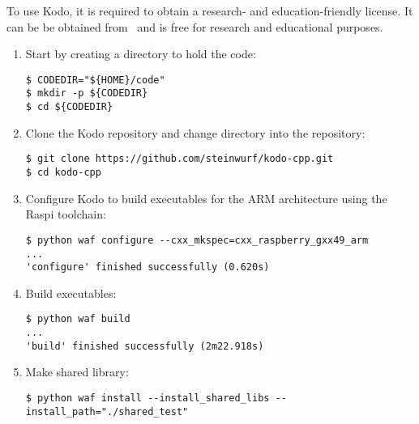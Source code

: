 
To use Kodo, it is required to obtain a research- and
education-friendly license.
It can be be obtained from~\cite{steinwurflicenselink} and is free
for research and educational purposes.


\begin{enumerate}

\item Start by creating a directory to hold the code:
\begin{lstlisting}[]
$ CODEDIR="${HOME}/code"
$ mkdir -p ${CODEDIR}
$ cd ${CODEDIR}
\end{lstlisting}
\FloatBarrier
\vspace{-5mm}

\item Clone the Kodo repository and change directory into the repository:
\begin{lstlisting}[]
$ git clone https://github.com/steinwurf/kodo-cpp.git
$ cd kodo-cpp
\end{lstlisting}
\FloatBarrier
\vspace{-5mm}

\item Configure Kodo to build executables for the \ac{ARM} architecture using the \ac{Raspi} toolchain:
\begin{lstlisting}[]
$ python waf configure --cxx_mkspec=cxx_raspberry_gxx49_arm
...
'configure' finished successfully (0.620s)
\end{lstlisting}
\FloatBarrier
\vspace{-5mm}

\item Build executables:
\begin{lstlisting}[]
$ python waf build
...
'build' finished successfully (2m22.918s)
\end{lstlisting}
\FloatBarrier
\vspace{-5mm}


\item Make shared library:
\begin{lstlisting}[]
$ python waf install --install_shared_libs --install_path="./shared_test"
\end{lstlisting}
\FloatBarrier
\vspace{-5mm}


\end{enumerate}
